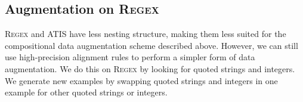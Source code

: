 \documentclass[11pt,letterpaper]{article}
\newcommand{\atis}{\textsc{ATIS}\xspace}
\newcommand{\regex}{\textsc{Regex}\xspace}
\newcommand{\catroot}{\textsc{Root}\xspace}
\newcommand{\catquotstr}{\textsc{Str}\xspace}
\newcommand{\catint}{\textsc{Int}\xspace}
\newcommand\pl[1]{\textcolor{red}{[PL: #1]}}
\newcommand\rj[1]{\textcolor{blue}{[RJ: #1]}}
\renewcommand\pl[1]{}
\renewcommand\rj[1]{}
\begin{document}
\subsection{Augmentation on \regex}
%
%
%
%
%
%
%
%
%
%
%
\regex and \atis have less nesting structure,
making them less suited for the compositional data augmentation scheme
described above.
However, we can still use high-precision alignment rules
to perform a simpler form of data augmentation.
We do this on \regex by looking for quoted strings and integers.
We generate new examples by
swapping quoted strings and integers in one example
for other quoted strings or integers.
\end{document}
